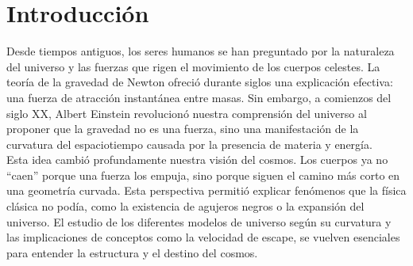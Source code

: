 \documentclass{aleph-revista}
\begin{document}
\membrete
\section{Introducción}
Desde tiempos antiguos, los seres humanos se han preguntado por la naturaleza del universo y las fuerzas que rigen el movimiento de los cuerpos celestes. La teoría de la gravedad de Newton ofreció durante siglos una explicación efectiva: una fuerza de atracción instantánea entre masas. Sin embargo, a comienzos del siglo XX, Albert Einstein revolucionó nuestra comprensión del universo al proponer que la gravedad no es una fuerza, sino una manifestación de la curvatura del espaciotiempo causada por la presencia de materia y energía.\\
Esta idea cambió profundamente nuestra visión del cosmos. Los cuerpos ya no “caen” porque una fuerza los empuja, sino porque siguen el camino más corto en una geometría curvada. Esta perspectiva permitió explicar fenómenos que la física clásica no podía, como la existencia de agujeros negros o la expansión del universo. El estudio de los diferentes modelos de universo según su curvatura y las implicaciones de conceptos como la velocidad de escape, se vuelven esenciales para entender la estructura y el destino del cosmos.
\end{document}
